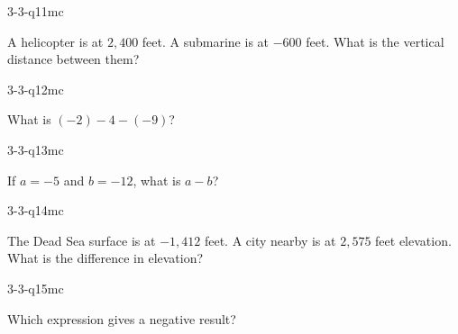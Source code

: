 \begin{practiceQuestion}{3-3-q11}{mc}
\begin{questionText}
A helicopter is at $2{,}400$ feet. A submarine is at $-600$ feet. What is the vertical distance between them?
\end{questionText}
\end{practiceQuestion}

\begin{practiceQuestion}{3-3-q12}{mc}
\begin{questionText}
What is $(-2) - 4 - (-9)$?
\end{questionText}
\end{practiceQuestion}

\begin{practiceQuestion}{3-3-q13}{mc}
\begin{questionText}
If $a = -5$ and $b = -12$, what is $a - b$?
\end{questionText}
\end{practiceQuestion}

\begin{practiceQuestion}{3-3-q14}{mc}
\begin{questionText}
The Dead Sea surface is at $-1{,}412$ feet. A city nearby is at $2{,}575$ feet elevation. What is the difference in elevation?
\end{questionText}
\end{practiceQuestion}

\begin{practiceQuestion}{3-3-q15}{mc}
\begin{questionText}
Which expression gives a negative result?
\end{questionText}
\end{practiceQuestion}

